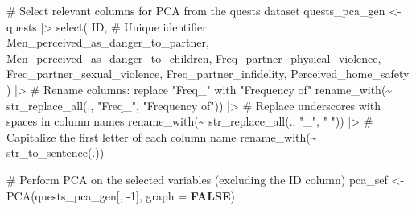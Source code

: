 \documentclass[
  bookmarksnumbered]{article}
\newenvironment{Shaded}{\begin{snugshade}}{\end{snugshade}}
\newcommand{\AttributeTok}[1]{\textcolor[rgb]{0.80,0.80,0.80}{#1}}
\newcommand{\CommentTok}[1]{\textcolor[rgb]{0.50,0.62,0.50}{#1}}
\newcommand{\ConstantTok}[1]{\textcolor[rgb]{0.86,0.64,0.64}{\textbf{#1}}}
\newcommand{\DecValTok}[1]{\textcolor[rgb]{0.86,0.86,0.80}{#1}}
\newcommand{\FunctionTok}[1]{\textcolor[rgb]{0.94,0.94,0.56}{#1}}
\newcommand{\NormalTok}[1]{\textcolor[rgb]{0.80,0.80,0.80}{#1}}
\newcommand{\OtherTok}[1]{\textcolor[rgb]{0.94,0.94,0.56}{#1}}
\newcommand{\SpecialCharTok}[1]{\textcolor[rgb]{0.86,0.64,0.64}{#1}}
\newcommand{\StringTok}[1]{\textcolor[rgb]{0.80,0.58,0.58}{#1}}
\begin{document}
\begin{Shaded}
\begin{Highlighting}[]
\CommentTok{\# Select relevant columns for PCA from the \textquotesingle{}quests\textquotesingle{} dataset}
\NormalTok{quests\_pca\_gen }\OtherTok{\textless{}{-}}\NormalTok{ quests }\SpecialCharTok{|\textgreater{}}
  \FunctionTok{select}\NormalTok{(}
\NormalTok{    ID, }\CommentTok{\# Unique identifier}
\NormalTok{    Men\_perceived\_as\_danger\_to\_partner,}
\NormalTok{    Men\_perceived\_as\_danger\_to\_children,}
\NormalTok{    Freq\_partner\_physical\_violence,}
\NormalTok{    Freq\_partner\_sexual\_violence,}
\NormalTok{    Freq\_partner\_infidelity,}
\NormalTok{    Perceived\_home\_safety}
\NormalTok{  ) }\SpecialCharTok{|\textgreater{}}
  \CommentTok{\# Rename columns: replace "Freq\_" with "Frequency of"}
  \FunctionTok{rename\_with}\NormalTok{(}\SpecialCharTok{\textasciitilde{}} \FunctionTok{str\_replace\_all}\NormalTok{(., }\StringTok{"Freq\_"}\NormalTok{, }\StringTok{"Frequency of"}\NormalTok{)) }\SpecialCharTok{|\textgreater{}}
  \CommentTok{\# Replace underscores with spaces in column names}
  \FunctionTok{rename\_with}\NormalTok{(}\SpecialCharTok{\textasciitilde{}} \FunctionTok{str\_replace\_all}\NormalTok{(., }\StringTok{"\_"}\NormalTok{, }\StringTok{" "}\NormalTok{)) }\SpecialCharTok{|\textgreater{}}
  \CommentTok{\# Capitalize the first letter of each column name}
  \FunctionTok{rename\_with}\NormalTok{(}\SpecialCharTok{\textasciitilde{}} \FunctionTok{str\_to\_sentence}\NormalTok{(.))}

\CommentTok{\# Perform PCA on the selected variables (excluding the ID column)}
\NormalTok{pca\_sef }\OtherTok{\textless{}{-}} \FunctionTok{PCA}\NormalTok{(quests\_pca\_gen[, }\SpecialCharTok{{-}}\DecValTok{1}\NormalTok{], }\AttributeTok{graph =} \ConstantTok{FALSE}\NormalTok{)}


\end{Highlighting}
\end{Shaded}
\end{document}
